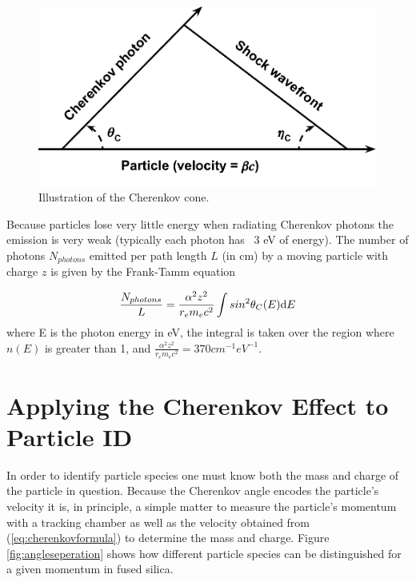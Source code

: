 \begin{figure}[ht]
	\centering
	\includegraphics[scale=1]{figures/Cherenkov_cone.pdf}
	\caption{Illustration of the Cherenkov cone.}
	\label{fig:cherenkovcone}
\end{figure}

Because particles lose very little energy when radiating Cherenkov photons the emission is very weak (typically each photon has ~$3$ eV of energy). The number of photons $N_{photons}$ emitted per path length $L$ (in cm) by a moving particle with charge $z$ is given by the Frank-Tamm equation

\begin{equation}
	\frac{N_{photons}}{L} = \frac{\alpha^2 z^2}{r_e m_e c^2} \int sin^2\theta_{C} (E) \mathrm{d} E
	\label{eq:nphotons}
\end{equation}
where E is the photon energy in eV, the integral is taken over the region where $n(E)$ is greater than 1, and $\frac{\alpha^2 z^2}{r_e m_e c^2} = 370 cm^{-1} eV^{-1}$.

\section{Applying the Cherenkov Effect to Particle ID}
In order to identify particle species one must know both the mass and charge of the particle in question. Because the Cherenkov angle encodes the particle's velocity it is, in principle, a simple matter to measure the particle's momentum with a tracking chamber as well as the velocity obtained from (\ref{eq:cherenkovformula}) to determine the mass and charge. Figure \ref{fig:angleseperation} shows how different particle species can be distinguished for a given momentum in fused silica.

